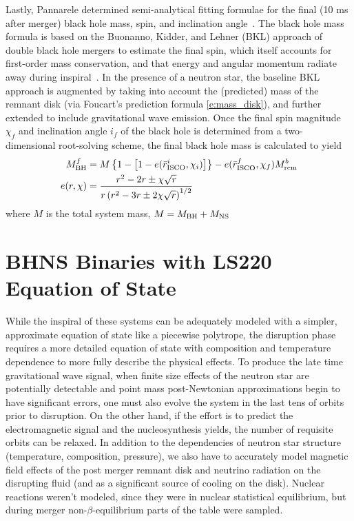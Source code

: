 Lastly, Pannarele determined semi-analytical fitting formulae for the final (10 ms after merger) black hole mass, spin, and inclination angle~\cite{PannaraleEtAl2013,Pannarale:2014}.
The black hole mass formula is based on the Buonanno, Kidder, and Lehner (BKL) approach of double black hole mergers to estimate the final spin, which itself accounts for first-order mass conservation, and that energy and angular momentum radiate away during inspiral~\cite{Buonanno2008a}.  
In the presence of a neutron star, the baseline BKL approach is augmented by taking into account the (predicted) mass of the remnant disk (via Foucart's prediction formula \ref{e:mass_disk}), and further extended to include gravitational wave emission.
Once the final spin magnitude  $\chi_f$ and inclination angle $i_f$ of the black hole is determined from a two-dimensional root-solving scheme, the final black hole mass is calculated to yield
\begin{align}
M^f_{\rm BH} &= 
M \left \{ 
1 - \left[1-e(\bar{r}^i_{\rm ISCO}, \chi_i) \right]
\right \}
- e(\bar{r}^f_{\rm ISCO}, \chi_f) M^b_{\rm rem}\\
e(r, \chi) &= 
\frac{ r^2 - 2 r \pm \chi \sqrt{r} }
{ r \left(r^2 - 3r \pm 2 \chi \sqrt{r}\right)^{1/2} }
\end{align}
where $M$ is the total system mass, $M = M_{\rm BH} +M_{\rm NS}$

\section{BHNS Binaries with LS220 Equation of State}

While the inspiral of these systems can be adequately modeled with a simpler, approximate equation of state like a piecewise polytrope, the disruption phase requires a more detailed equation of state with composition and temperature dependence to more fully describe the physical effects.  
To produce the late time gravitational wave signal, when finite size effects of the neutron star are potentially detectable and point mass post-Newtonian approximations begin to have significant errors, one must also evolve the system in the last tens of orbits prior to disruption.  
On the other hand, if the effort is to predict the electromagnetic signal and the nucleosynthesis yields, the number of requisite orbits can be relaxed.  
In addition to the dependencies of neutron star structure (temperature, composition, pressure), we also have to accurately model magnetic field effects of the post merger remnant disk and neutrino radiation on the disrupting fluid (and as a significant source of cooling on the disk).
Nuclear reactions weren't modeled, since they were in nuclear statistical equilibrium, but during merger non-$\beta$-equilibrium parts of the table were sampled.


